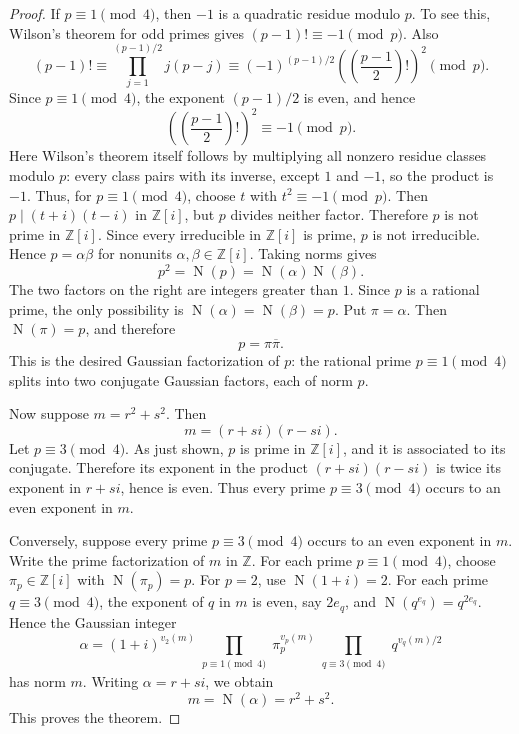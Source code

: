 \documentclass[11pt]{article}
\theoremstyle{remark}
\newcommand{\Norm}{\operatorname{N}}
\begin{document}
\begin{proof}
If \(p\equiv1\pmod4\), then \(-1\) is a quadratic residue modulo \(p\).  To see
this, Wilson's theorem for odd primes gives \((p-1)!\equiv-1\pmod p\).  Also
\[
        (p-1)!\equiv \prod_{j=1}^{(p-1)/2} j(p-j)
        \equiv (-1)^{(p-1)/2}\left(\left(\frac{p-1}{2}\right)!\right)^2\pmod p.
\]
Since \(p\equiv1\pmod4\), the exponent \((p-1)/2\) is even, and hence
\[
        \left(\left(\frac{p-1}{2}\right)!\right)^2\equiv -1\pmod p.
\]
Here Wilson's theorem itself follows by multiplying all nonzero residue classes
modulo \(p\): every class pairs with its inverse, except \(1\) and \(-1\), so the
product is \(-1\).  Thus, for \(p\equiv1\pmod4\), choose \(t\) with
\(t^2\equiv-1\pmod p\).  Then \(p\mid(t+i)(t-i)\) in \(\mathbb Z[i]\), but
\(p\) divides neither factor.  Therefore \(p\) is not prime in \(\mathbb Z[i]\).  Since every irreducible
in \(\mathbb Z[i]\) is prime, \(p\) is not irreducible.  Hence
\(p=\alpha\beta\) for nonunits \(\alpha,\beta\in\mathbb Z[i]\).  Taking norms gives
\[
        p^2=\Norm(p)=\Norm(\alpha)\Norm(\beta).
\]
The two factors on the right are integers greater than \(1\).  Since \(p\) is a
rational prime, the only possibility is
\(\Norm(\alpha)=\Norm(\beta)=p\).  Put \(\pi=\alpha\).  Then
\(\Norm(\pi)=p\), and therefore
\[
        p=\pi\overline{\pi}.
\]
This is the desired Gaussian factorization of \(p\): the rational prime
\(p\equiv1\pmod4\) splits into two conjugate Gaussian factors, each of norm
\(p\).

Now suppose \(m=r^2+s^2\).  Then
\[
        m=(r+si)(r-si).
\]
Let \(p\equiv3\pmod4\).  As just shown, \(p\) is prime in \(\mathbb Z[i]\), and
it is associated to its conjugate.  Therefore its exponent in the product
\((r+si)(r-si)\) is twice its exponent in \(r+si\), hence is even.  Thus every
prime \(p\equiv3\pmod4\) occurs to an even exponent in \(m\).

Conversely, suppose every prime \(p\equiv3\pmod4\) occurs to an even exponent in
\(m\).  Write the prime factorization of \(m\) in \(\mathbb Z\).  For each prime
\(p\equiv1\pmod4\), choose \(\pi_p\in\mathbb Z[i]\) with \(\Norm(\pi_p)=p\).  For
\(p=2\), use \(\Norm(1+i)=2\).  For each prime \(q\equiv3\pmod4\), the exponent of
\(q\) in \(m\) is even, say \(2e_q\), and \(\Norm(q^{e_q})=q^{2e_q}\).  Hence the
Gaussian integer
\[
        \alpha=(1+i)^{v_2(m)}
        \prod_{\substack{p\equiv1\pmod4}} \pi_p^{v_p(m)}
        \prod_{\substack{q\equiv3\pmod4}} q^{v_q(m)/2}
\]
has norm \(m\).  Writing \(\alpha=r+si\), we obtain
\[
        m=\Norm(\alpha)=r^2+s^2.
\]
This proves the theorem.
\end{proof}
\end{document}
